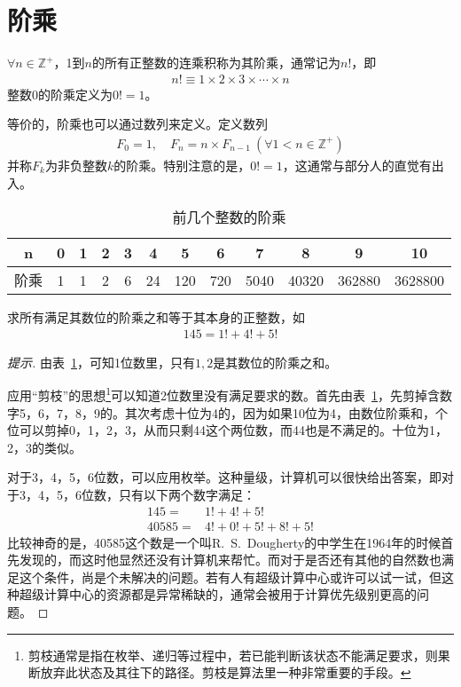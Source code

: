 \section{阶乘}
\label{sec:factorial}

\begin{definition}
  $\forall n\in\mathbb{Z}^+$，1到$n$的所有正整数的连乘积称为其阶乘，通常记为$n!$，即
  \begin{align*}
    n!\equiv 1\times 2\times 3\times \cdots\times n
  \end{align*}
  整数0的阶乘定义为$0!=1$。
\end{definition}

等价的，阶乘也可以通过数列来定义。定义数列
\begin{align*}
  F_0=1, \quad F_{n} = n\times F_{n-1}\ (\forall 1<n\in\mathbb{Z}^+)
\end{align*}
并称$F_k$为非负整数$k$的阶乘。特别注意的是，$0!=1$，这通常与部分人的直觉有出入。

\begin{table}[htbp]
  \centering
  \caption{前几个整数的阶乘}
  \label{tab:factorial-of-first-n-numbers}
  \begin{tabular}{c|ccccccccccc}
    \hline
    n   & 0 & 1 & 2 & 3 & 4  & 5    & 6   & 7 &    8 & 9 & 10\\ \hline
    阶乘 & 1 & 1 & 2 & 6 & 24 & 120 & 720 & 5040 & 40320 & 362880 & 3628800\\
    \hline
  \end{tabular}
\end{table}

\begin{example}
  求所有满足其数位的阶乘之和等于其本身的正整数，如
  \begin{align*}
    145=1!+4!+5!
  \end{align*}
\end{example}
\begin{proof}[提示]
  由表~\ref{tab:factorial-of-first-n-numbers}，可知1位数里，只有$1,2$是其数位的阶乘之和。

  应用“剪枝”的思想\footnote{剪枝通常是指在枚举、递归等过程中，若已能判断该状态不能满足要求，则果断放弃此状态及其往下的路径。剪枝是算法里一种非常重要的手段。}可以知道2位数里没有满足要求的数。首先由表~\ref{tab:factorial-of-first-n-numbers}，先剪掉含数字5，6，7，8，9的。其次考虑十位为4的，因为如果10位为4，由数位阶乘和，个位可以剪掉0，1，2，3，从而只剩44这个两位数，而44也是不满足的。十位为1，2，3的类似。

  对于3，4，5，6位数，可以应用枚举。这种量级，计算机可以很快给出答案，即对于3，4，5，6位数，只有以下两个数字满足：
  \begin{align*}
      145 ={}& 1! + 4! + 5!\\
    40585 ={}& 4! + 0! + 5! + 8! + 5!
  \end{align*}
  比较神奇的是，40585这个数是一个叫R.~S.~Dougherty的中学生在1964年的时候首先发现的，而这时他显然还没有计算机来帮忙。而对于是否还有其他的自然数也满足这个条件，尚是个未解决的问题。若有人有超级计算中心或许可以试一试，但这种超级计算中心的资源都是异常稀缺的，通常会被用于计算优先级别更高的问题。
\end{proof}

